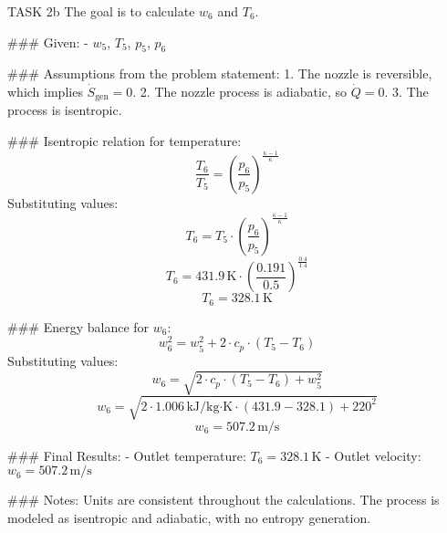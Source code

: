 TASK 2b  
The goal is to calculate \( w_6 \) and \( T_6 \).  

### Given:  
- \( w_5 \), \( T_5 \), \( p_5 \), \( p_6 \)  

### Assumptions from the problem statement:  
1. The nozzle is reversible, which implies \( \dot{S}_{\text{gen}} = 0 \).  
2. The nozzle process is adiabatic, so \( \dot{Q} = 0 \).  
3. The process is isentropic.  

### Isentropic relation for temperature:  
\[
\frac{T_6}{T_5} = \left( \frac{p_6}{p_5} \right)^{\frac{\kappa - 1}{\kappa}}
\]  
Substituting values:  
\[
T_6 = T_5 \cdot \left( \frac{p_6}{p_5} \right)^{\frac{\kappa - 1}{\kappa}}
\]  
\[
T_6 = 431.9 \, \text{K} \cdot \left( \frac{0.191}{0.5} \right)^{\frac{0.4}{1.4}}
\]  
\[
T_6 = 328.1 \, \text{K}
\]  

### Energy balance for \( w_6 \):  
\[
w_6^2 = w_5^2 + 2 \cdot c_p \cdot (T_5 - T_6)
\]  
Substituting values:  
\[
w_6 = \sqrt{2 \cdot c_p \cdot (T_5 - T_6) + w_5^2}
\]  
\[
w_6 = \sqrt{2 \cdot 1.006 \, \text{kJ/kg·K} \cdot (431.9 - 328.1) + 220^2}
\]  
\[
w_6 = 507.2 \, \text{m/s}
\]  

### Final Results:  
- Outlet temperature: \( T_6 = 328.1 \, \text{K} \)  
- Outlet velocity: \( w_6 = 507.2 \, \text{m/s} \)  

### Notes:  
Units are consistent throughout the calculations. The process is modeled as isentropic and adiabatic, with no entropy generation.